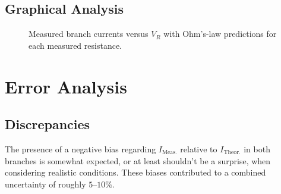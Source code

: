 \documentclass[11pt]{article}
\begin{document}
    \subsection{Graphical Analysis}
        \begin{figure}[H]
            \centering
            \caption{Measured branch currents versus $V_R$ with Ohm’s-law predictions for each measured resistance.}
            \label{fig:ohms_law}
        \end{figure}

\section{Error Analysis}
    \subsection{Discrepancies}
        The presence of a negative bias regarding $I_{\text{Meas.}}$ relative to $I_{\text{Theor.}}$ in both branches is somewhat expected, or at least shouldn't be a surprise, when considering realistic conditions.
        These biases contributed to a combined uncertainty of roughly \(5\text{–}10\%\).\\
\end{document}
